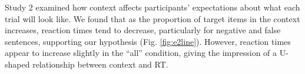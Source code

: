\documentclass[10pt,letterpaper]{article}
\begin{document}

Study 2 examined how context affects participants' expectations about what each trial will look like.  We found that as the proportion of target items in the context increases, reaction times tend to decrease, particularly for negative and false sentences, supporting our hypothesis (Fig. \ref{fig:e2line}).  However, reaction times appear to increase slightly in the ``all'' condition, giving the impression of a U-shaped relationship between context and RT.  
\end{document}
